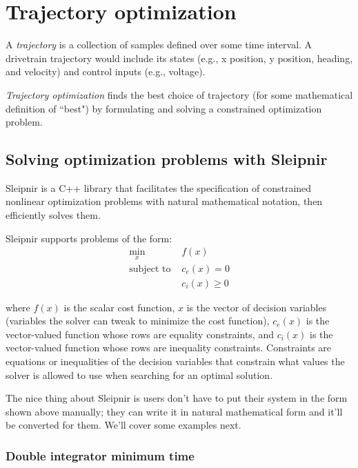 
\chapter{Trajectory optimization}

A \textit{trajectory} is a collection of samples defined over some time
interval. A drivetrain trajectory would include its states (e.g., x position, y
position, heading, and velocity) and control inputs (e.g., voltage).

\textit{Trajectory optimization} finds the best choice of trajectory (for some
mathematical definition of ``best") by formulating and solving a constrained
optimization problem.

\section{Solving optimization problems with Sleipnir}

Sleipnir is a C++ library that facilitates the specification of constrained
nonlinear optimization problems with natural mathematical notation, then
efficiently solves them.

Sleipnir supports problems of the form:
\begin{align*}
  \min_x             &f(x) \\
  \text{subject to } &c_e(x) = 0 \\
                     &c_i(x) \geq 0
\end{align*}

where $f(x)$ is the scalar cost function, $x$ is the vector of decision
variables (variables the solver can tweak to minimize the cost function),
$c_e(x)$ is the vector-valued function whose rows are equality constraints, and
$c_i(x)$ is the vector-valued function whose rows are inequality constraints.
Constraints are equations or inequalities of the decision variables that
constrain what values the solver is allowed to use when searching for an optimal
solution.

The nice thing about Sleipnir is users don't have to put their system in the
form shown above manually; they can write it in natural mathematical form and
it'll be converted for them. We'll cover some examples next.

\subsection{Double integrator minimum time}


